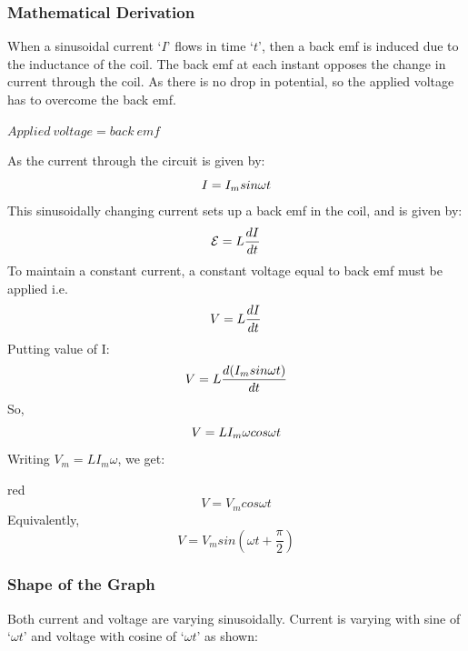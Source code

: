 \subsubsection{Mathematical Derivation}
When a sinusoidal current `$I$' flows in time `$t$', then
a back emf is induced due to the inductance of the coil.
The back emf at each instant opposes the change in current
through the coil. As there is no drop in potential,
so the applied voltage has to overcome the back emf.
\begin{center}
    $Applied \ voltage=back \ emf$
\end{center}
As the current through the circuit is given by:
\begin{equation}\notag
    I = I_{m} sin \omega t
\end{equation}
This sinusoidally changing current sets up a back emf in the coil,
and is given by:
\begin{equation}\notag
    \mathcal{E}= L \frac{dI}{dt}
\end{equation}
To maintain a constant current, a constant voltage equal to back emf
must be applied i.e.
\begin{equation}\notag
    V = L \frac{dI}{dt}
\end{equation}
Putting value of I:
\begin{equation}\notag
    V = L \frac{d(I_{m}sin\omega t)}{dt}
\end{equation}
So,
\begin{equation}\notag
    V = L I_{m} \omega cos\omega t
\end{equation}
Writing $V_{m} = L I_{m} \omega$, we get:
\begin{mybox}{red}{}
\begin{equation}\label{eq:15.19}
    V = V_{m} cos \omega t
\end{equation}
Equivalently,
\begin{equation}\label{eq:15.20}
    V = V_{m} sin( \omega t + \frac{\pi}{2})
\end{equation}
\end{mybox}

\subsubsection{Shape of the Graph}
Both current and voltage are varying sinusoidally.
Current is varying with sine of ‘$\omega t$’ and voltage with
cosine of ‘$\omega t$’ as shown:

